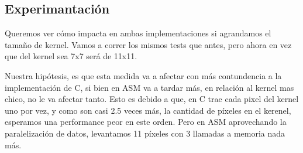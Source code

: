 \subsection{Experimantación}
Queremos ver cómo impacta en ambas implementaciones si agrandamos el tamaño de kernel. Vamos a correr los mismos tests que antes, pero ahora en vez que del kernel sea 7x7 será de 11x11.

Nuestra hipótesis, es que esta medida va a afectar con más contundencia a la implementación de C, si bien en ASM va a tardar más, en relación al kernel mas chico, no le va afectar tanto. Esto es debido a que, en C trae cada pixel del kernel uno por vez, y como son casi 2.5 veces más, la cantidad de píxeles en el kerenel, esperamos una performance peor en este orden. Pero en ASM aprovechando la paralelización de datos, levantamos 11 píxeles con 3 llamadas a memoria nada más.

